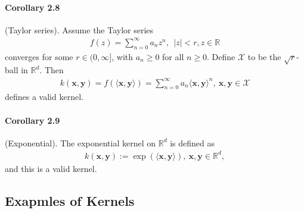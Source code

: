 \documentclass{article}
\begin{document}
\paragraph{Corollary 2.8} (Taylor series). Assume the Taylor series
\begin{align*}
	f(z) = \sum_{n=0}^\infty a_nz^n,\ \ \vert z\vert < r, z\in\mathbb{R}\tag{2.11}
\end{align*}
converges for some $r\in(0,\infty]$, with $a_n\geq 0$ for all $n\geq 0$. Define $\mathcal{X}$ to be the $\sqrt{r}$-ball in $\mathbb{R}^d$. Then
\begin{align*}
	k(\mathbf{x},\mathbf{y}) = f(\langle \mathbf{x}, \mathbf{y}\rangle) = \sum_{n=0}^\infty a_n\langle \mathbf{x}, \mathbf{y}\rangle^n,\  \mathbf{x},\mathbf{y}\in\mathcal{X}\tag{2.12}
\end{align*}
defines a valid kernel.

\paragraph{Corollary 2.9} (Exponential). The exponential kernel on $\mathbb{R}^d$ is defined as
\begin{align*}
k(\mathbf{x},\mathbf{y}) := \exp(\langle \mathbf{x}, \mathbf{y}\rangle),\ \mathbf{x},\mathbf{y}\in\mathbb{R}^d,\tag{2.13}
\end{align*}
and this is a valid kernel.

\subsection{Exapmles of Kernels}
\end{document}
